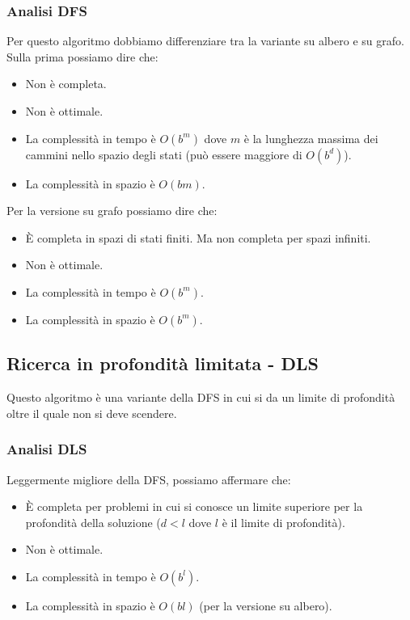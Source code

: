\subsubsection{Analisi DFS}
Per questo algoritmo dobbiamo differenziare tra la variante su albero e su grafo. Sulla prima
possiamo dire che:
\begin{itemize}
	\item Non \`e completa.
	\item Non \`e ottimale.
	\item La complessit\`a in tempo \`e $O(b^m)$ dove $m$ \`e la lunghezza massima dei cammini
	      nello spazio degli stati (pu\`o essere maggiore di $O(b^d)$).
	\item La complessit\`a in spazio \`e $O(bm)$.
\end{itemize}
Per la versione su grafo possiamo dire che:
\begin{itemize}
	\item \`E completa in spazi di stati finiti. Ma non completa per spazi infiniti.
	\item Non \`e ottimale.
	\item La complessit\`a in tempo \`e $O(b^m)$.
	\item La complessit\`a in spazio \`e $O(b^m)$.
\end{itemize}

\subsection{Ricerca in profondit\`a limitata - DLS}
Questo algoritmo \`e una variante della DFS in cui si da un limite di profondit\`a oltre
il quale non si deve scendere.

\subsubsection{Analisi DLS}
Leggermente migliore della DFS, possiamo affermare che:
\begin{itemize}
	\item \`E completa per problemi in cui si conosce un limite superiore per la profondit\`a
	      della soluzione ($d < l$ dove $l$ \`e il limite di profondit\`a).
	\item Non \`e ottimale.
	\item La complessit\`a in tempo \`e $O(b^l)$.
	\item La complessit\`a in spazio \`e $O(bl)$ (per la versione su albero).
\end{itemize}